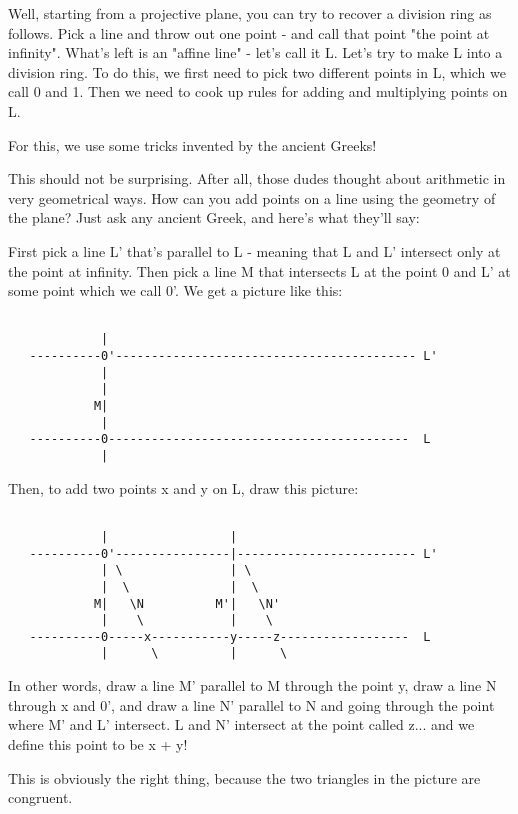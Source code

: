 Well, starting from a projective plane, you can try to recover a
division ring as follows.  Pick a line and throw out one point - and
call that point "the point at infinity".  What's left is an 
"affine
line" - let's call it L.  Let's try to make L into a division ring.  To
do this, we first need to pick two different points in L, which we call
0 and 1.  Then we need to cook up rules for adding and multiplying
points on L.  

For this, we use some tricks invented by the ancient Greeks!   

This should not be surprising.  After all, those dudes thought about
arithmetic in very geometrical ways.   How can you add points on a line
using the geometry of the plane?  Just ask any ancient Greek, and here's
what they'll say:

First pick a line L' that's parallel to L - meaning that L and L'
intersect only at the point at infinity.  Then pick a line M that
intersects L at the point 0 and L' at some point which we call 0'.  
We get a picture like this:


\begin{verbatim}

             |             
   ----------0'------------------------------------------ L'
             |             
             |             
            M|             
             |             
   ----------0------------------------------------------  L
             |             
\end{verbatim}
    
Then, to add two points x and y on L, draw this picture:



\begin{verbatim}

             |                 |
   ----------0'----------------|------------------------- L'
             | \               | \
             |  \              |  \
            M|   \N          M'|   \N'
             |    \            |    \
   ----------0-----x-----------y-----z------------------  L
             |      \          |      \
\end{verbatim}
    
In other words, draw a line M' parallel to M through the point y,
draw a line N through x and 0', and draw a line N' parallel to N and
going through the point where M' and L' intersect.  L and N' intersect
at the point called z... and we define this point to be x + y!   

This is obviously the right thing, because the two triangles in the
picture are congruent.

